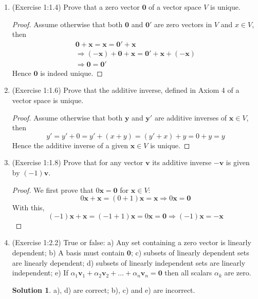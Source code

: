 \documentclass[]{book}
\theoremstyle{definition}
\newtheorem*{soln}{Solution}
\newcommand{\x}{\mathbf{x}}
\newcommand{\y}{\mathbf{y}}
\newcommand{\0}{\mathbf{0}}
\begin{document}
\begin{enumerate}
\item (Exercise 1:1.4)
Prove that a zero vector $\0$ of a vector space $V$ is unique.
\begin{proof}
Assume otherwise that both $\0$ and $\0'$ are zero vectors in $V$ and $x\in V$, then \newline
\begin{gather*} 
\0+\x=\x=\0'+\x \\
\Rightarrow (-\x)+\0+\x=\0'+\x+(-\x) \\
\Rightarrow \0=\0'
\end{gather*}
Hence $\0$ is indeed unique.
\end{proof}

\item (Exercise 1:1.6)
Prove that the additive inverse, defined in Axiom 4 of a vector space is unique.
\begin{proof}
Assume otherwise that both $\y$ and $\y'$ are additive inverses of $\x\in V$, then
\[
    y'=y'+0=y'+(x+y)=(y'+x)+y=0+y=y
\]
Hence the additive inverse of a given $\x\in V$ is unique.
\end{proof}

\item (Exercise 1:1.8)
Prove that for any vector $\mathbf{v}$ its additive inverse $-\mathbf{v}$ is given by $(-1)\mathbf{v}$.
\begin{proof}
We first prove that $0\x=\0$ for $\x\in V$:
\[
0\x+\x=(0+1)\x=\x \Rightarrow 0\x=\0
\]
With this,
\[
(-1)\x+\x=(-1+1)\x=0\x=\0 \Rightarrow (-1)\x=-\x
\]
\end{proof}

\item (Exercise 1:2.2)
True or false:\newline
a) Any set containing a zero vector is linearly dependent; \newline
b) A basis must contain $\0$; \newline
c) subsets of linearly dependent sets are linearly dependent; \newline
d) subsets of linearly independent sets are linearly independent; \newline
e) If $\alpha_1 \mathbf{v}_1 + \alpha_2 \mathbf{v}_2 +...+ \alpha_n \mathbf{v}_n = \0$ then all scalars $\alpha_k$ are zero.
\begin{soln}
a), d) are correct; b), c) and e) are incorrect.
\end{soln}


\end{enumerate}
\end{document}
